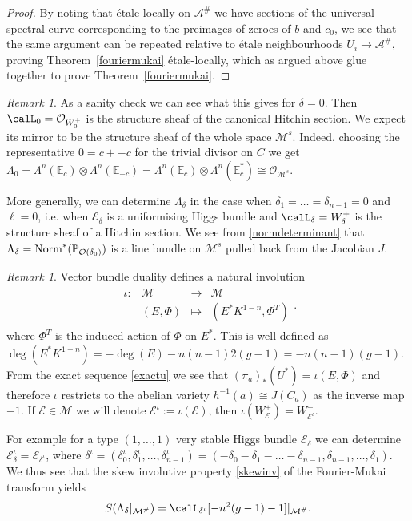 \documentclass[12pt]{article}
\numberwithin{equation}{section}
\theoremstyle{remark}
\newtheorem{remark}[theorem]{Remark}
\theoremstyle{definition}
\numberwithin{theorem}{section}
\def\beq{\begin{eqnarray}}
\def\eeq{\end{eqnarray}}
\def\bP{{\mathbb P}}
\def\calE{{\mathcal E}}
\def\Nm{{\rm Norm}}
\def\bE{{\mathbb{E}}}
\def\M{{\mathcal{M}}}
\def\calA{{\mathcal{A}}}
\def\calF{{\mathcal{F}}}
\def\calO{{\mathcal O}}
\def\d{{{\delta}}}
\renewcommand{\1}{\mathbbm{1}}
\begin{document}
\begin{proof}
	By noting that   \'etale-locally on $\calA^\#$  we have sections of the universal spectral curve corresponding to the preimages of zeroes of $b$ and $c_0$, we see that the same argument can be repeated relative to \'etale neighbourhoods $U_i\to \calA^\#$, proving Theorem~\ref{fouriermukai} \'etale-locally, which as argued above glue together to prove Theorem~\ref{fouriermukai}.
\end{proof}

\begin{remark} As a sanity check we can see what this gives for $\delta=0$. Then $\calL_0=\calO_{W^+_0}$ is the structure sheaf of the canonical Hitchin section. We expect its mirror to be the structure sheaf of the whole space $\M^s$. Indeed, choosing the representative $0=c+-c$ for the trivial divisor on $C$ we get $\Lambda_0=\Lambda^n(\bE_{c})\otimes \Lambda^n(\bE_{-c})=\Lambda^n(\bE_{c})\otimes \Lambda^n(\bE^*_{c})\cong \calO_{\M^s}$. 
	
	More generally, we can determine $\Lambda_\delta$ in the case when $\delta_1=\dots=\delta_{n-1}=0$ and $\ell=0$, i.e. when $\calE_\delta$ is a uniformising Higgs bundle and $\calL_\delta=W^+_\delta$ is the structure sheaf of a Hitchin section. We see from \eqref{normdeterminant} that $\Lambda_\delta=\Nm^*(\bP_{\calO(\delta_0)})$ is a line bundle on $\M^s$ pulled back from the Jacobian $J$. 
\end{remark}

\begin{remark} \label{remarkdual} Vector bundle duality defines a natural  involution \beq \label{iota} \begin{array}{cccc} \iota:&\M&\to &\M\\ &(E,\Phi)&\mapsto &(E^*K^{1-n},\Phi^T)\end{array}.\eeq where $\Phi^T$ is the induced action  of $\Phi$ on $E^*$. This is well-defined as $\deg(E^*K^{1-n})=-\deg(E)-n(n-1)2(g-1)=-n(n-1)(g-1)$. From the exact sequence \eqref{exactu} we see that $(\pi_a)_*(U^*) =\iota(E,\Phi)$ and therefore $\iota$ restricts to the abelian variety $h^{-1}(a)\cong J(C_a)$ as the inverse map $-1$. If $\calE\in \M$ we will denote $\calE^\iota:=\iota(\calE)$, then $\iota(W^+_\calE)=W^+_{\calE^\iota}$.  
	
	For example for a type $(1,\dots,1)$ very stable Higgs bundle $\calE_{\d}$ we can determine $\calE^\iota_{\d}=\calE_{ \d^\iota}$, where  $\d^\iota=(\delta_0^\iota,\delta_1^\iota,\dots,\delta_{n-1}^\iota)=(-\delta_0-\delta_1-\dots-\delta_{n-1},\delta_{n-1},\dots,\delta_1)$.  We thus see that the skew involutive property \eqref{skewinv} of the Fourier-Mukai transform  yields
	\beq \label{mirrormirror} S(\Lambda_{\d}|_{\M^\#})=\calL_{\d^\iota}[-n^2(g-1)-1]|_{\M^\#}.\eeq 
\end{remark}
\end{document}
